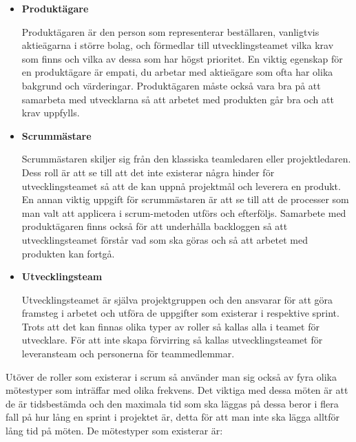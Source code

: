 \begin{itemize}
	\item \textbf{Produktägare}
	
	Produktägaren är den person som representerar beställaren, vanligtvis aktieägarna i större bolag, och förmedlar till utvecklingsteamet vilka krav som finns och vilka av dessa som har högst prioritet. En viktig egenskap för en produktägare är empati, du arbetar med aktieägare som ofta har olika bakgrund och värderingar. Produktägaren måste också vara bra på att samarbeta med utvecklarna så att arbetet med produkten går bra och att krav uppfylls.
	
	\item \textbf{Scrummästare}
	
	Scrummästaren skiljer sig från den klassiska teamledaren eller projektledaren. Dess roll är att se till att det inte existerar några hinder för utvecklingsteamet så att de kan uppnå projektmål och leverera en produkt. En annan viktig uppgift för scrummästaren är att se till att de processer som man valt att applicera i scrum-metoden utförs och efterföljs. Samarbete med produktägaren finns också för att underhålla backloggen så att utvecklingsteamet förstår vad som ska göras och så att arbetet med produkten kan fortgå.
	
	\item \textbf{Utvecklingsteam}
	
	Utvecklingsteamet är själva projektgruppen och den ansvarar för att göra framsteg i arbetet och utföra de uppgifter som existerar i respektive sprint. Trots att det kan finnas olika typer av roller så kallas alla i teamet för utvecklare. För att inte skapa förvirring så kallas utvecklingsteamet för leveransteam och personerna för teammedlemmar.	
\end{itemize}

Utöver de roller som existerar i scrum så använder man sig också av fyra olika mötestyper som inträffar med olika frekvens. Det viktiga med dessa möten är att de är tidsbestämda och den maximala tid som ska läggas på dessa beror i flera fall på hur lång en sprint i projektet är, detta för att man inte ska lägga alltför lång tid på möten. De mötestyper som existerar är:

